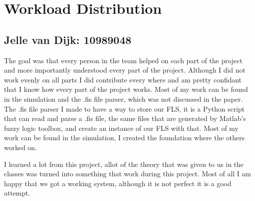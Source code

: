 \documentclass[conference]{IEEEtran}
\begin{document}
\newpage

\section{Workload Distribution}
\subsection*{Jelle van Dijk: 10989048}
The goal was that every person in the team helped on each part of the project and more importantly understood every part of the project. Although I did not work evenly on all parts I did contribute every where and am pretty confidant that I know how every part of the project works. Most of my work can be found in the simulation and the .fis file parser, which was not discussed in the paper. The .fis file parser I made to have a way to store our FLS, it is a Python script that can read and parse a .fis file, the same files that are generated by Matlab's fuzzy logic toolbox, and create an instance of our FLS with that. Most of my work can be found in the simulation, I created the foundation where the others worked on.


I learned a lot from this project, allot of the theory that was given to us in the classes was turned into something that work during this project. Most of all I am happy that we got a working system, although it is not perfect it is a good attempt.


\end{document}
